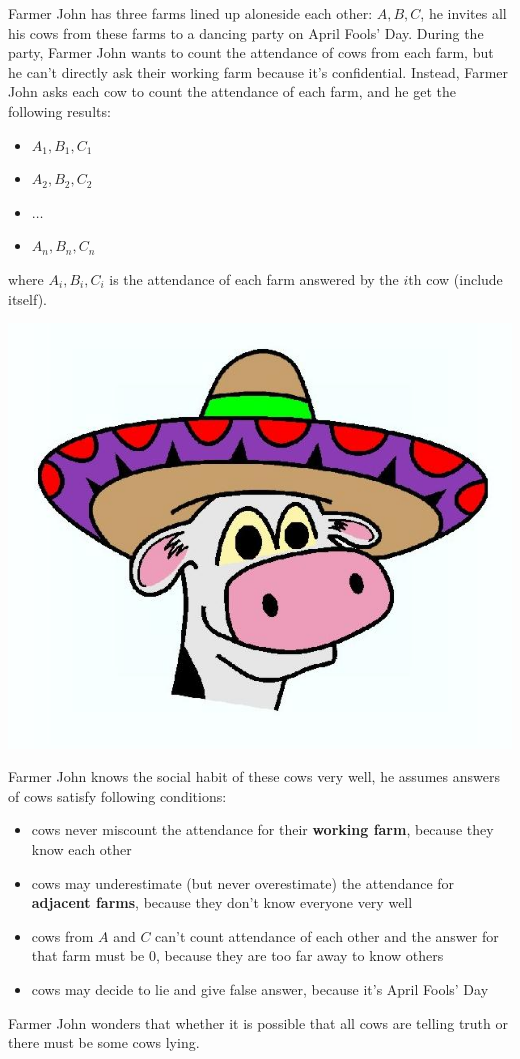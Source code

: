 Farmer John has three farms lined up aloneside each other: $A, B, C$,
he invites all his cows from these farms to a dancing party on April Fools' Day.
During the party, Farmer John wants to count the attendance of cows from each farm,
but he can't directly ask their working farm because it's confidential.
Instead, Farmer John asks each cow to count the attendance of each farm, and he get the following results:
\begin{itemize}
  \item $A_1, B_1, C_1$
  \item $A_2, B_2, C_2$
  \item $\ldots$
  \item $A_n, B_n, C_n$
\end{itemize}
where $A_i, B_i, C_i$ is the attendance of each farm answered by the $i$th cow (include itself).

\begin{center}
  \includegraphics[scale=0.3, natwidth=623, natheight=526]{cows.jpg}
\end{center}

Farmer John knows the social habit of these cows very well, he assumes answers of cows satisfy following conditions:
\begin{itemize}
  \item cows never miscount the attendance for their \textbf{working farm}, because they know each other
  \item cows may underestimate (but never overestimate) the attendance for \textbf{adjacent farms}, because they don't know everyone very well
  \item cows from $A$ and $C$ can't count attendance of each other and the answer for that farm must be $0$, because they are too far away to know others 
  \item cows may decide to lie and give false answer, because it's April Fools' Day
\end{itemize}

Farmer John wonders that whether it is possible that all cows are telling truth or there must be some cows lying.
